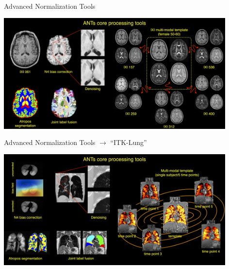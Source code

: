 \documentclass[ignorenonframetext,]{beamer}
\begin{document}
\begin{frame}{Advanced Normalization Tools}

\begin{center}

\includegraphics[width=4.75in]{./tools/figures/coreANtsToolsNeuro.png}

\end{center}

\end{frame}

\begin{frame}{Advanced Normalization Tools \(\rightarrow\) ``ITK-Lung''}

\begin{center}

\includegraphics[width=4.75in]{./tools/figures/coreANtsToolsLung.png}

\end{center}

\end{frame}
\end{document}
